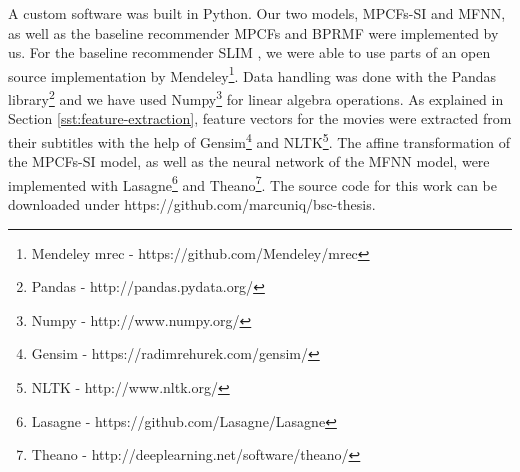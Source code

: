 A custom software was built in Python.
Our two models, MPCFs-SI and MFNN, as well as the baseline recommender MPCFs \cite{Kabbur2015} and BPRMF \cite{Rendle2009} were implemented by us.
For the baseline recommender SLIM \cite{Ning2011}, we were able to use parts of an open source implementation by Mendeley\footnote{Mendeley mrec - https://github.com/Mendeley/mrec}.
Data handling was done with the Pandas library\footnote{Pandas - http://pandas.pydata.org/} and we have used Numpy\footnote{Numpy - http://www.numpy.org/} for linear algebra operations.
As explained in Section \ref{sst:feature-extraction}, feature vectors for the movies were extracted from their subtitles with the help of Gensim\footnote{Gensim - https://radimrehurek.com/gensim/} and NLTK\footnote{NLTK - http://www.nltk.org/}.
The affine transformation of the MPCFs-SI model, as well as the neural network of the MFNN model, were implemented with Lasagne\footnote{Lasagne - https://github.com/Lasagne/Lasagne} and Theano\footnote{Theano - http://deeplearning.net/software/theano/}.
The source code for this work can be downloaded under https://github.com/marcuniq/bsc-thesis.
